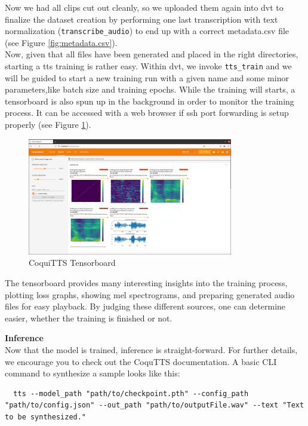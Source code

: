 \documentclass[
  a4paper,  %
  twoside,  %
  bibliography=totoc,
  headsepline,
  cleardoublepage=empty,
  parskip=half,
  draft=false
]{scrbook}
\begin{document}
Now we had all clips cut out cleanly, so we uploaded them again into \gls{dvt} to finalize the dataset creation by performing one last transcription with text normalization (\verb|transcribe_audio|) to end up with a correct metadata.csv file (see Figure \ref{fig:metadata.csv}). \\
Now, given that all files have been generated and placed in the right directories, starting a \gls{tts} training is rather easy. Within \gls{dvt}, we invoke \verb|tts_train| and we will be guided to start a new training run with a given name and some minor parameters,like batch size and training epochs. While the training will starts, a tensorboard is also spun up in the background in order to monitor the training process. It can be accessed with a web browser if ssh port forwarding is setup properly (see Figure \ref{fig:tensorboard}).
\begin{figure}[h]
  \centering
  \includegraphics[width=0.8\textwidth]{./graphics/images/tts/tensorboard.png}
  \caption{CoquiTTS Tensorboard \cite{TensorboardPngMbarnig2022}}
  \label{fig:tensorboard}
\end{figure}
The tensorboard provides many interesting insights into the training process, plotting loss graphs, showing mel spectrograms, and preparing generated audio files for easy playback. By judging these different sources, one can determine easier, whether the training is finished or not. 

\textbf{Inference} \\
Now that the model is trained, inference is straight-forward. For further details, we encourage you to check out the CoquTTS documentation. A basic CLI command to synthesize a sample looks like this:
\begin{lstlisting}
  tts --model_path "path/to/checkpoint.pth" --config_path "path/to/config.json" --out_path "path/to/outputFile.wav" --text "Text to be synthesized."
\end{lstlisting}
\end{document}

